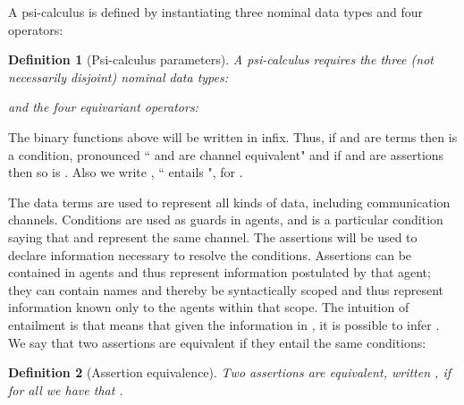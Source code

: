 \documentclass{eptcs}
\newtheorem{definition}{Definition}
\theoremstyle{definition}
\begin{document}
\newcommand{\terms}{{\rm\bf T}}
\newcommand{\conditions}{{\rm\bf C}}
\newcommand{\assertions}{{\rm\bf A}}


A psi-calculus is defined by instantiating three nominal data types and four operators:
\begin{definition}[Psi-calculus parameters]
\label{def:parameters}
A psi-calculus requires the three (not necessarily disjoint) nominal data types:

and the four equivariant operators:

\end{definition}
The binary functions above will be written in infix. Thus, if  and  are terms then  is a condition, pronounced `` and  are channel equivalent" and if  and  are assertions then so is . Also we write , `` entails ", for .


The data terms are used to represent all kinds of data, including communication
channels. Conditions are used as guards in agents, and  is a
particular condition saying that  and  represent the
same channel.
The assertions will be used to declare information necessary to resolve the
conditions. Assertions can be contained in agents and thus represent information
postulated by that agent; they can contain names and thereby be syntactically
scoped and thus represent information known only to the agents within that
scope. 
The intuition of entailment is that  means that given the
information in , it is possible to infer .
 We say that two assertions are equivalent if they entail the same conditions:
\begin{definition}[Assertion equivalence]
\label{def:assEq}
Two assertions are {\em equivalent}, written , if for all  we have that .
\end{definition}
\end{document}
